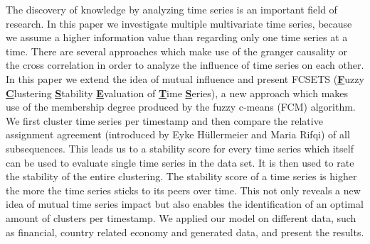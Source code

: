 
The discovery of knowledge by analyzing time series is an important field of research. In this paper we investigate multiple multivariate time series, because we assume a higher information value than regarding only one time series at a time. There are several approaches which make use of the granger causality or the cross correlation in order to analyze the influence of time series on each other. In this paper we extend the idea of mutual influence and present FCSETS (\textbf{\underline{F}}uzzy \textbf{\underline{C}}lustering \textbf{\underline{S}}tability \textbf{\underline{E}}valuation of \textbf{\underline{T}}ime \textbf{\underline{S}}eries), a new approach which makes use of the membership degree produced by the fuzzy c-means (FCM) algorithm. We first cluster time series per timestamp and then compare the relative assignment agreement (introduced by Eyke H{\"u}ller\-meier and Maria Rifqi) of all subsequences. This leads us to a stability score for every time series which itself can be used to evaluate single time series in the data set. It is then used to rate the stability of the entire clustering. The stability score of a time series is higher the more the time series sticks to its peers over time. This not only reveals a new idea of mutual time series impact but also enables the identification of an optimal amount of clusters per timestamp.
We applied our model on different data, such as financial, country related economy and generated data, and present the results.


